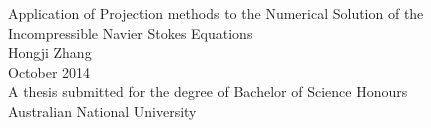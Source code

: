 \begin{titlepage}
\begin{center}

\vspace*{\fill} \Huge
                        Application of Projection methods to the Numerical Solution of the Incompressible Navier Stokes Equations
\\
\vfill\vfill\Large
                          Hongji Zhang
\\
\vfill\vfill
                          October 2014
\\
\vfill\vfill \normalsize
         A thesis submitted for the degree of Bachelor of Science Honours\\
         Australian National University
\vfill

\end{center}

\end{titlepage}
